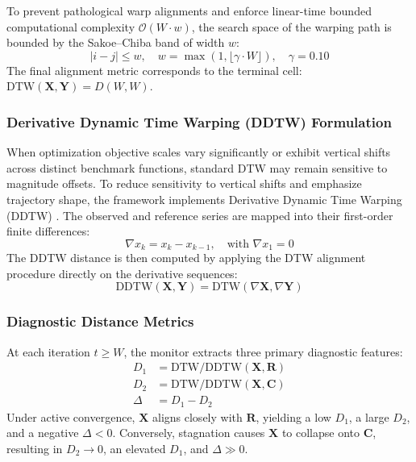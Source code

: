 \documentclass[review]{elsarticle}
\begin{document}
To prevent pathological warp alignments and enforce linear-time bounded computational complexity $\mathcal{O}(W \cdot w)$, the search space of the warping path is bounded by the Sakoe--Chiba band of width $w$:
\begin{equation}
|i - j| \le w, \quad w = \max(1, \lfloor \gamma \cdot W \rfloor), \quad \gamma = 0.10
\label{eq:sakoe_chiba}
\end{equation}
The final alignment metric corresponds to the terminal cell: $\text{DTW}(\mathbf{X}, \mathbf{Y}) = D(W, W)$.

\subsubsection{Derivative Dynamic Time Warping (DDTW) Formulation}

When optimization objective scales vary significantly or exhibit vertical shifts across distinct benchmark functions, standard DTW may remain sensitive to magnitude offsets. To reduce sensitivity to vertical shifts and emphasize trajectory shape, the framework implements Derivative Dynamic Time Warping (DDTW) \cite{keogh2001derivative}. The observed and reference series are mapped into their first-order finite differences:
\begin{equation}
\nabla x_k = x_k - x_{k-1}, \quad \text{with } \nabla x_1 = 0
\label{eq:derivative_transform}
\end{equation}
The DDTW distance is then computed by applying the DTW alignment procedure directly on the derivative sequences:
\begin{equation}
\text{DDTW}(\mathbf{X}, \mathbf{Y}) = \text{DTW}(\nabla \mathbf{X}, \nabla \mathbf{Y})
\label{eq:ddtw_metric}
\end{equation}

\subsubsection{Diagnostic Distance Metrics}

At each iteration $t \ge W$, the monitor extracts three primary diagnostic features:
\begin{align}
D_1 &= \text{DTW/DDTW}(\mathbf{X}, \mathbf{R}) \label{eq:d1_dist} \\
D_2 &= \text{DTW/DDTW}(\mathbf{X}, \mathbf{C}) \label{eq:d2_dist} \\
\Delta &= D_1 - D_2 \label{eq:delta_metric}
\end{align}
Under active convergence, $\mathbf{X}$ aligns closely with $\mathbf{R}$, yielding a low $D_1$, a large $D_2$, and a negative $\Delta < 0$. Conversely, stagnation causes $\mathbf{X}$ to collapse onto $\mathbf{C}$, resulting in $D_2 \to 0$, an elevated $D_1$, and $\Delta \gg 0$.
\end{document}

